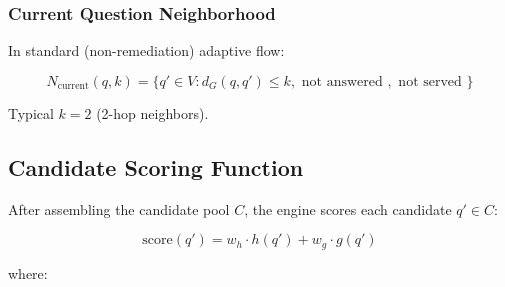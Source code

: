 \documentclass[sigconf,authordraft,twoside]{acmart}
\begin{document}
\subsubsection{Current Question Neighborhood}
In standard (non-remediation) adaptive flow:

\begin{equation}
N_{\text{current}}(q, k) = \{q' \in V : d_G(q, q') \leq k, \text{ not answered }, \text{ not served }\}
\end{equation}

Typical $k = 2$ (2-hop neighbors).

\subsection{Candidate Scoring Function}

After assembling the candidate pool $C$, the engine scores each candidate $q' \in C$:

\begin{equation}
\text{score}(q') = w_h \cdot h(q') + w_g \cdot g(q')
\end{equation}

where:
\end{document}
